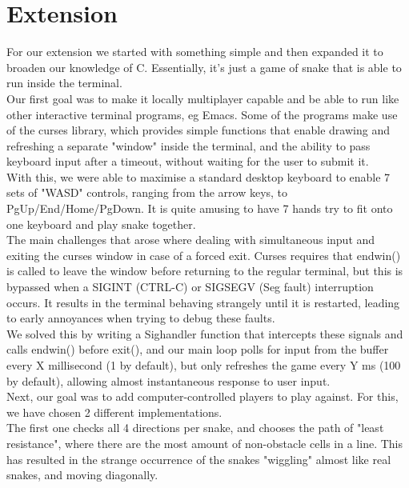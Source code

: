 \documentclass{article}
\begin{document}
\section{Extension}
For our extension we started with something simple and then expanded it to broaden our knowledge of C. Essentially, it's just a game of snake that is able to run inside the terminal.\\

Our first goal was to make it locally multiplayer capable and be able to run like other interactive terminal programs, eg Emacs. Some of the programs make use of the curses library, which provides simple functions that enable drawing and refreshing a separate "window" inside the terminal, and the ability to pass keyboard input after a timeout, without waiting for the user to submit it.\\

With this, we were able to maximise a standard desktop keyboard to enable 7 sets of "WASD" controls, ranging from the arrow keys, to PgUp/End/Home/PgDown. It is quite amusing to have 7 hands try to fit onto one keyboard and play snake together.\\

The main challenges that arose where dealing with simultaneous input and exiting the curses window in case of a forced exit. Curses requires that endwin() is called to leave the window before returning to the regular terminal, but this is bypassed when a SIGINT (CTRL-C) or SIGSEGV (Seg fault) interruption occurs. It results in the terminal behaving strangely until it is restarted, leading to early annoyances when trying to debug these faults.\\
We solved this by writing a Sighandler function that intercepts these signals and calls endwin() before exit(), and our main loop polls for input from the buffer every X millisecond (1 by default), but only refreshes the game every Y ms (100 by default), allowing almost instantaneous response to user input.\\

Next, our goal was to add computer-controlled players to play against. For this, we have chosen 2 different implementations.\\
The first one checks all 4 directions per snake, and chooses the path of "least resistance", where there are the most amount of non-obstacle cells in a line. This has resulted in the strange occurrence of the snakes "wiggling" almost like real snakes, and moving diagonally.\\
\end{document}
